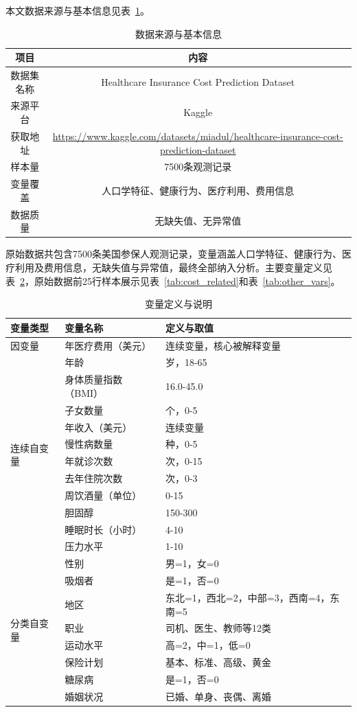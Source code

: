 \documentclass[a4paper]{ctexart}
\begin{document}
本文数据来源与基本信息见表~\ref{tab:datasource}。
\begin{table}[H]
\centering
\caption{数据来源与基本信息}
\label{tab:datasource}
\begin{tabular}{cc}
\toprule
项目 & 内容 \\
\midrule
数据集名称 & Healthcare Insurance Cost Prediction Dataset \\
来源平台 & Kaggle \\
获取地址 & \url{https://www.kaggle.com/datasets/miadul/healthcare-insurance-cost-prediction-dataset} \\
样本量 & 7500条观测记录 \\
变量覆盖 & 人口学特征、健康行为、医疗利用、费用信息 \\
数据质量 & 无缺失值、无异常值 \\
\bottomrule
\end{tabular}
\end{table}

原始数据共包含7500条美国参保人观测记录，变量涵盖人口学特征、健康行为、医疗利用及费用信息，无缺失值与异常值，最终全部纳入分析。主要变量定义见表~\ref{tab:vardef}，原始数据前25行样本展示见表~\ref{tab:cost_related}和表~\ref{tab:other_vars}。

\begin{table}[H]
\centering
\caption{变量定义与说明}
\label{tab:vardef}
\begin{tabular}{p{3cm}p{3cm}p{6cm}}
\toprule
变量类型 & 变量名称 & 定义与取值 \\
\midrule
因变量 & 年医疗费用（美元） & 连续变量，核心被解释变量 \\
\midrule
\multirow{11}{*}{连续自变量} & 年龄 & 岁，18-65 \\
& 身体质量指数（BMI） & 16.0-45.0 \\
& 子女数量 & 个，0-5 \\
& 年收入（美元） & 连续变量 \\
& 慢性病数量 & 种，0-5 \\
& 年就诊次数 & 次，0-15 \\
& 去年住院次数 & 次，0-3 \\
& 周饮酒量（单位） & 0-15 \\
& 胆固醇 & 150-300 \\
& 睡眠时长（小时） & 4-10 \\
& 压力水平 & 1-10 \\
\midrule
\multirow{8}{*}{分类自变量} & 性别 & 男=1，女=0 \\
& 吸烟者 & 是=1，否=0 \\
& 地区 & 东北=1，西北=2，中部=3，西南=4，东南=5 \\
& 职业 & 司机、医生、教师等12类 \\
& 运动水平 & 高=2，中=1，低=0 \\
& 保险计划 & 基本、标准、高级、黄金 \\
& 糖尿病 & 是=1，否=0 \\
& 婚姻状况 & 已婚、单身、丧偶、离婚 \\
\bottomrule
\end{tabular}
\end{table}
\end{document}
